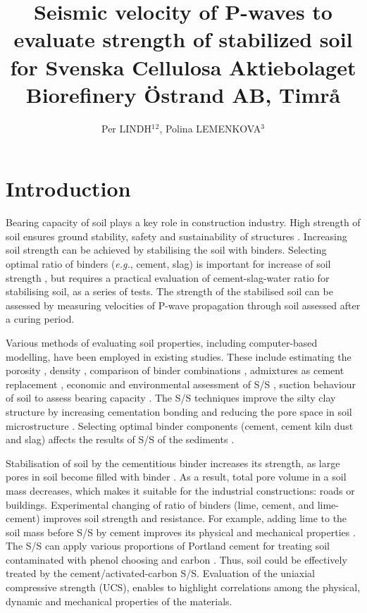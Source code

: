 \documentclass[10pt,twoside,twocolumn,a4paper]{article}
\title{Seismic velocity of P-waves to evaluate strength of stabilized soil for Svenska Cellulosa Aktiebolaget Biorefinery \"Ostrand AB, Timr\aa}
\author{Per LINDH$^{1}$$^{2}$\email{per.a.lindh@gmail.com}, \space Polina LEMENKOVA$^{3}$\email{polina.lemenkova@ulb.be}}
\begin{document}
\maketitle


\section{Introduction}

Bearing capacity of soil plays a key role in construction industry. High strength of soil ensures ground stability, safety and sustainability of structures \cite{Czarnecki}. Increasing soil strength can be achieved by stabilising the soil with binders. Selecting optimal ratio of binders (\emph{e.g.}, cement, slag) is important for increase of soil strength \cite{Lindh2001,Xizhong,LindhWinter}, but requires a practical evaluation of cement-slag-water ratio for stabilising soil, as a series of tests. The strength of the stabilised soil can be assessed by measuring velocities of P-wave propagation through soil assessed after a curing period.

Various methods of evaluating soil properties, including computer-based modelling, have been employed in existing studies. These include estimating the porosity \cite{Lemenkov2021a,Uyanik}, density \cite{Consoli,Lemenkov2021b}, comparison of binder combinations \cite{Bernal}, admixtures as cement replacement \cite{Eyo}, economic and environmental assessment of S/S \cite{Rocha}, suction behaviour of soil to assess bearing capacity \cite{Emeryetal}. The S/S techniques improve the silty clay structure by increasing cementation bonding and reducing the pore space in soil microstructure \cite{Horpibulsuk}. Selecting optimal binder components (cement, cement kiln dust and slag) affects the results of S/S of the sediments \cite{Lindh2021a} . 

Stabilisation of soil by the cementitious binder increases its strength, as large pores in soil become filled with binder \cite{Lindh202102}. As a result, total pore volume in a soil mass decreases, which makes it suitable for the industrial constructions: roads or buildings. Experimental changing of ratio of binders (lime, cement, and lime-cement) improves soil strength and resistance. For example, adding lime to the soil mass before S/S by cement improves its physical and mechanical properties \cite{Mahmood}. The S/S can apply various proportions of Portland cement for treating soil contaminated with phenol choosing and carbon \cite{Suetal2009}. Thus, soil could be effectively treated by the cement/activated-carbon S/S. Evaluation of the uniaxial compressive strength (UCS), \cite{Diamantis} enables to highlight correlations among the physical, dynamic and mechanical properties of the materials. 
\end{document}
